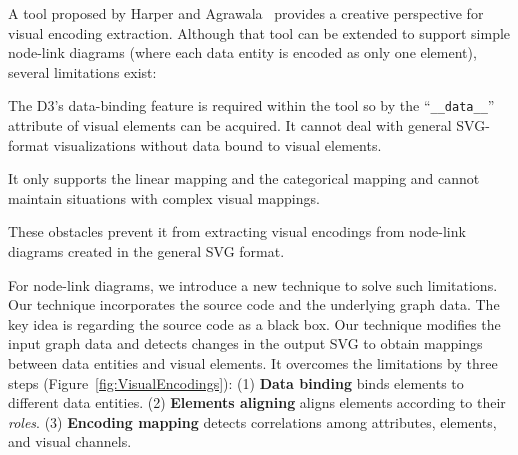 A tool proposed by Harper and Agrawala~\cite{DBLP:conf/uist/HarperA14} provides a creative perspective for visual encoding extraction.
Although that tool can be extended to support simple node-link diagrams (where each data entity is encoded as only one element), several limitations exist:
\begin{compactenum}
\item The D3's data-binding feature is required within the tool so by the ``\texttt{\_\_data\_\_}'' attribute of visual elements can be acquired. 
It cannot deal with general SVG-format visualizations without data bound to visual elements.

\item It only supports the linear mapping and the categorical mapping and cannot maintain situations with complex visual mappings.
\end{compactenum}
These obstacles prevent it from extracting visual encodings from node-link diagrams created in the general SVG format.

For node-link diagrams, we introduce a new technique to solve such limitations.
Our technique incorporates the source code and the underlying graph data.
The key idea is regarding the source code as a black box.
Our technique modifies the input graph data and detects changes in the output SVG to obtain mappings between data entities and visual elements.
It overcomes the limitations by three steps (Figure~\ref{fig:VisualEncodings}):
(1) \textbf{Data binding} binds elements to different data entities.
(2) \textbf{Elements aligning} aligns elements according to their \textit{roles}. 
(3) \textbf{Encoding mapping} detects correlations among attributes, elements, and visual channels.

